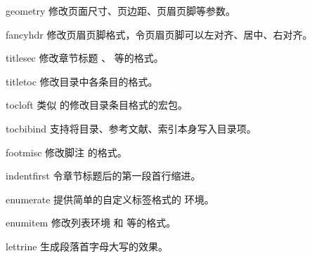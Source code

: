 \begin{pkglist}
  \item[geometry] 修改页面尺寸、页边距、页眉页脚等参数。
  \item[fancyhdr] 修改页眉页脚格式，令页眉页脚可以左对齐、居中、右对齐。
  \item[titlesec] 修改章节标题 、 等的格式。
  \item[titletoc] 修改目录中各条目的格式。
  \item[tocloft]  类似  的修改目录条目格式的宏包。
  \item[tocbibind] 支持将目录、参考文献、索引本身写入目录项。
  \item[footmisc] 修改脚注  的格式。
  \item[indentfirst] 令章节标题后的第一段首行缩进。
  \item[enumerate] 提供简单的自定义标签格式的  环境。
  \item[enumitem] 修改列表环境  和  等的格式。
  \item[lettrine] 生成段落首字母大写的效果。
\end{pkglist}

\endinput